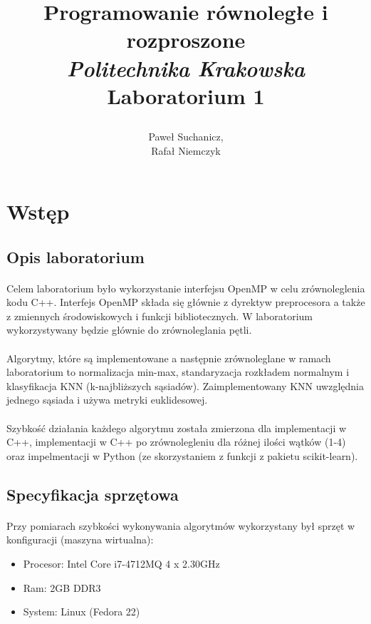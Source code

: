 \documentclass[a4paper,11pt]{article}
\title{
	\textbf{Programowanie równoległe i rozproszone}\vspace{40pt}
	\\\textit{Politechnika Krakowska} \\\vspace{40pt}
	Laboratorium 1
	\vspace{300pt}

}
\author{
	Paweł Suchanicz,\\
	Rafał Niemczyk
}
\begin{document}
\begin{titlepage}
\maketitle
\end{titlepage}

\begin{center}
\tableofcontents
\end{center}
\newpage
\section{Wstęp}
\subsection{Opis laboratorium}
\paragraph{}Celem laboratorium było wykorzystanie interfejsu OpenMP w celu zrównoleglenia kodu C++. Interfejs OpenMP składa się głównie z dyrektyw preprocesora a także z zmiennych środowiskowych i funkcji bibliotecznych. W laboratorium wykorzystywany będzie głównie do zrównoleglania pętli.
\paragraph{}Algorytmy, które są implementowane a następnie zrównoleglane w ramach laboratorium to normalizacja min-max, standaryzacja rozkładem normalnym i klasyfikacja KNN (k-najbliższych sąsiadów). Zaimplementowany KNN  uwzględnia jednego sąsiada i używa metryki euklidesowej.
\paragraph{}Szybkość działania każdego algorytmu została zmierzona dla implementacji w C++, implementacji w C++ po zrównolegleniu dla różnej ilości wątków (1-4) oraz impelmentacji w Python (ze skorzystaniem z funkcji z pakietu scikit-learn).
\subsection{Specyfikacja sprzętowa}
\paragraph{}Przy pomiarach szybkości wykonywania algorytmów wykorzystany był sprzęt w konfiguracji (maszyna wirtualna):
\begin{itemize}
\item Procesor: Intel Core i7-4712MQ 4 x 2.30GHz
\item Ram: 2GB DDR3
\item System: Linux (Fedora 22)
\end{itemize}
\end{document}
